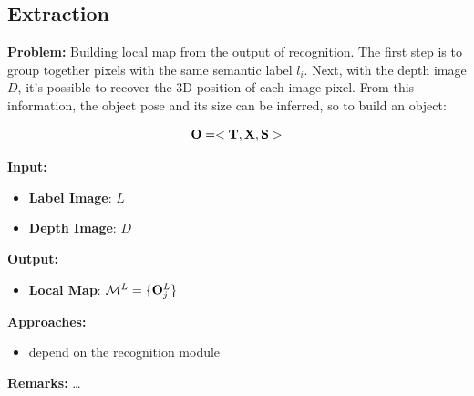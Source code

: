\documentclass{article}
\begin{document}
	\subsection{Extraction}
	
	{\bf Problem: } Building local map from the output of recognition. The first step is to group together pixels with the same semantic label $l_i$. Next, with the depth image $D$, it's possible to recover the 3D position of each image pixel. From this information, the object pose and its size can be inferred, so to build an object:
	
	\begin{equation}
	 \mathbf{O} = < \mathbf{T}, \mathbf{X}, \mathbf{S} > 
	\end{equation}
	
	\noindent
	{\bf Input: }
	\begin{itemize}
		\item {\bf Label Image}: $L$
		\item {\bf Depth Image}: $D$
	\end{itemize}
	\noindent
	{\bf Output: }
	\begin{itemize}
		\item {\bf Local Map}: $\mathcal{M}^L = \{ \mathbf{O}_j^L \}$
	\end{itemize}
	\noindent
	{\bf Approaches: }
	\begin{itemize}
		\item depend on the recognition module
	\end{itemize}
	\noindent
	{\bf Remarks: } \dots
	
\end{document}
